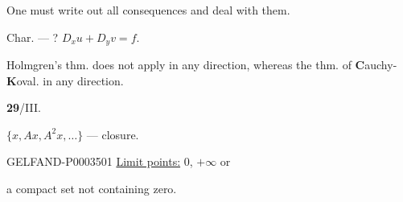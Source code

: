 One must write out all consequences and deal with them.
\begin{center}\end{center}
Char. --- ? $D_xu+D_yv=f$.

Holmgren’s thm. does not apply in any direction, whereas the thm. of
\textbf{C}auchy-\textbf{K}oval. in any direction.


\textbf{29}/III.\qquad{}


$\{x, Ax, A^2x,\ldots\}$ --- closure.

\begin{GelfandAdjacentEvidence}{GELFAND-P000350}{1}
\uline{Limit points:} $0$, $+\infty$ or
\end{GelfandAdjacentEvidence}

a compact set not containing zero.

